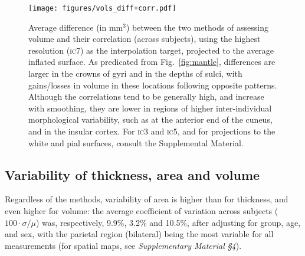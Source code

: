 \begin{figure}[!p]
\begin{center}
\texttt{[image: figures/vols\_diff+corr.pdf]}
\end{center}
\caption[Average difference and correlation between the two methods of assessing volume.]{Average difference (in mm$^3$) between the two methods of assessing volume and their correlation (across subjects), using the highest resolution (\textsc{ic}7) as the interpolation target, projected to the average inflated surface. As predicated from Fig.~\ref{fig:mantle}, differences are larger in the crowns of gyri and in the depths of sulci, with gains/losses in volume in these locations following opposite patterns. Although the correlations tend to be generally high, and increase with smoothing, they are lower in regions of higher inter-individual morphological variability, such as at the anterior end of the cuneus, and in the insular cortex. For \textsc{ic}3 and \textsc{ic5}, and for projections to the white and pial surfaces, consult the Supplemental Material.}
\label{fig:maps_vols}
\end{figure}

\subsection{Variability of thickness, area and volume}

Regardless of the methods, variability of area is higher than for thickness, and even higher for volume: the average coefficient of variation across subjects ($100\cdot\sigma/\mu$) was, respectively, 9.9\%, 3.2\% and 10.5\%, after adjusting for group, age, and sex, with the parietal region (bilateral) being the most variable for all measurements (for spatial maps, see \emph{Supplementary Material §4}).

\begin{figure}[!p]
\end{figure}

